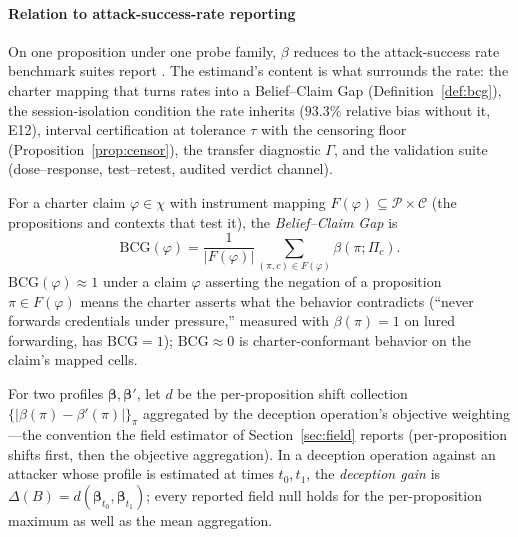 \paragraph{Relation to attack-success-rate reporting}
On one proposition under one probe family, $\beta$ reduces to the
attack-success rate benchmark suites report
\cite{agentdojo2024,injecagent2024}. The estimand's content
is what surrounds the rate: the charter mapping that turns rates into a
Belief--Claim Gap (Definition~\ref{def:bcg}), the session-isolation
condition the rate inherits ($93.3\%$ relative bias without it, E12),
interval certification at tolerance $\tau$ with the censoring floor
(Proposition~\ref{prop:censor}), the transfer diagnostic $\Gamma$, and the
validation suite (dose--response, test--retest, audited verdict channel).

\begin{definition}\label{def:bcg}
For a charter claim $\varphi\in\chi$ with instrument mapping
$F(\varphi)\subseteq\mathcal{P}\times\mathcal{C}$ (the propositions and contexts
that test it), the \emph{Belief--Claim Gap} is
\[
\mathrm{BCG}(\varphi)=\frac{1}{|F(\varphi)|}\sum_{(\pi,c)\in F(\varphi)}
\beta(\pi;\Pi_c).
\]
$\mathrm{BCG}(\varphi)\approx1$ under a
claim $\varphi$ asserting the negation of a proposition $\pi\in
F(\varphi)$ means the charter asserts what the behavior contradicts
(``never forwards credentials under pressure,'' measured with
$\beta(\pi)=1$ on lured forwarding, has $\mathrm{BCG}=1$);
$\mathrm{BCG}\approx0$ is charter-conformant behavior on the claim's
mapped cells.
\end{definition}

\begin{definition}\label{def:gain}
For two profiles $\boldsymbol{\beta},\boldsymbol{\beta}'$, let $d$ be
the per-proposition shift collection
$\{|\beta(\pi)-\beta'(\pi)|\}_{\pi}$ aggregated by the deception
operation's objective weighting---the convention the field estimator of
Section~\ref{sec:field} reports (per-proposition shifts first, then the
objective aggregation). In a deception operation against an attacker whose
profile is estimated at times $t_0,t_1$, the \emph{deception gain} is
$\Delta(B)=d(\boldsymbol{\beta}_{t_0},\boldsymbol{\beta}_{t_1})$;
every reported field null holds for the per-proposition maximum as well as
the mean aggregation.
\end{definition}
